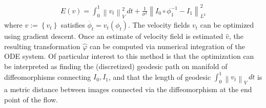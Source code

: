 \documentclass{6838publ}
\newcommand{\norm}[1]{\left\lVert#1\right\rVert}
\newcommand\pc[1]{\ensuremath{\left\{ #1 \right\}}} %
\begin{document}
\begin{align}
    E(v)
        = \int_0^1 \norm{v_t}_V^2 \, dt + \frac{1}{\sigma^2} \norm{ I_0 \circ \phi_1^{-1} - I_1 }_{L^2}^2
\end{align}
where $v := \pc{v_t}$ satisfies $\dot{\phi_t} =  v_t(\phi_t)$. The velocity fields $v_t$ can be optimized using gradient descent. Once an estimate of velocity field is estimated $\hat{v}$, the resulting transformation $\hat{\varphi}$ can be computed via numerical integration of the ODE system. Of particular interest to this method is that the optimization can be interpreted as finding the (discretized) geodesic path on manifold of diffeomorphisms connecting $I_0,I_1$, and that the length of geodesic $\int_0^1 \norm{v_t}_V \, dt$ is a metric distance between images connected via the diffeomorphism at the end point of the flow.




\end{document}
